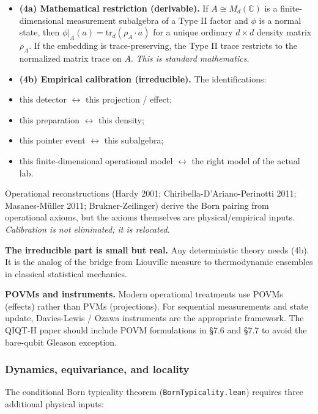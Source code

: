 \documentclass[11pt,a4paper]{article}
\begin{document}
\begin{itemize}
  \item \textbf{(4a) Mathematical restriction (derivable).} If $A \cong M_d(\mathbb{C})$ is a finite-dimensional measurement subalgebra of a Type II factor and $\phi$ is a normal state, then $\phi|_A(a) = \mathrm{tr}_d(\rho_A \cdot a)$ for a unique ordinary $d \times d$ density matrix $\rho_A$. If the embedding is trace-preserving, the Type II trace restricts to the normalized matrix trace on $A$. \emph{This is standard mathematics.}
  \item \textbf{(4b) Empirical calibration (irreducible).} The identifications:
  \item this detector $\leftrightarrow$ this projection / effect;
  \item this preparation $\leftrightarrow$ this density;
  \item this pointer event $\leftrightarrow$ this subalgebra;
  \item this finite-dimensional operational model $\leftrightarrow$ the right model of the actual lab.
\end{itemize}
  
  Operational reconstructions (Hardy 2001; Chiribella-D'Ariano-Perinotti 2011; Masanes-Müller 2011; Brukner-Zeilinger) derive the Born pairing from operational axioms, but the axioms themselves are physical/empirical inputs. \emph{Calibration is not eliminated; it is relocated.}

\textbf{The irreducible part is small but real.} Any deterministic theory needs (4b). It is the analog of the bridge from Liouville measure to thermodynamic ensembles in classical statistical mechanics.

\textbf{POVMs and instruments.} Modern operational treatments use POVMs (effects) rather than PVMs (projections). For sequential measurements and state update, Davies-Lewis / Ozawa instruments are the appropriate framework. The QIQT-H paper should include POVM formulations in §7.6 and §7.7 to avoid the bare-qubit Gleason exception.

\subsubsection{Dynamics, equivariance, and locality}

The conditional Born typicality theorem (\texttt{BornTypicality.lean}) requires three additional physical inputs:
\end{document}
